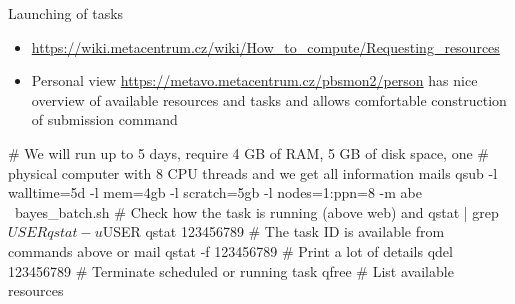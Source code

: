 \documentclass[compress, ucs, xelatex, 11pt, xcolor=svgnames,
  hyperref={
    bookmarks=true,
    unicode=true,
    colorlinks=true,
    pdftitle={Linux, command line and MetaCentrum},
    plainpages=false,
    pdfauthor={Vojtech Zeisek},
    pdfsubject={Course about use of Linux command line, writing shell scripts and using MetaCentrum of CESNET},
    pdfcreator={XeLaTeX},
    pdfkeywords={Linux, GNU, BASH, shell, command line, MetaCentrum},
    linkcolor=DarkRed,
    anchorcolor=DarkBlue,
    citecolor=Indigo,
    filecolor=NavyBlue,
    menucolor=DarkMagenta,
    urlcolor=DarkBlue,
    pdftex},
  url={hyphens, lowtilde} %
  ]{beamer}
\begin{document}
\begin{frame}[fragile]{Launching of tasks} %
  \begin{itemize}
    \item \url{https://wiki.metacentrum.cz/wiki/How_to_compute/Requesting_resources}
    \item Personal view \url{https://metavo.metacentrum.cz/pbsmon2/person} has nice overview of available resources and tasks and allows comfortable construction of submission command
  \end{itemize}
  \begin{bashcode}
    # We will run up to 5 days, require 4 GB of RAM, 5 GB of disk space, one
    # physical computer with 8 CPU threads and we get all information mails
    qsub -l walltime=5d -l mem=4gb -l scratch=5gb -l nodes=1:ppn=8 -m abe \
      bayes_batch.sh
    # Check how the task is running (above web) and
    qstat | grep $USER
    qstat -u $USER
    qstat 123456789 # The task ID is available from commands above or mail
    qstat -f 123456789 # Print a lot of details
    qdel 123456789 # Terminate scheduled or running task
    qfree # List available resources
  \end{bashcode}
\end{frame}
\end{document}
